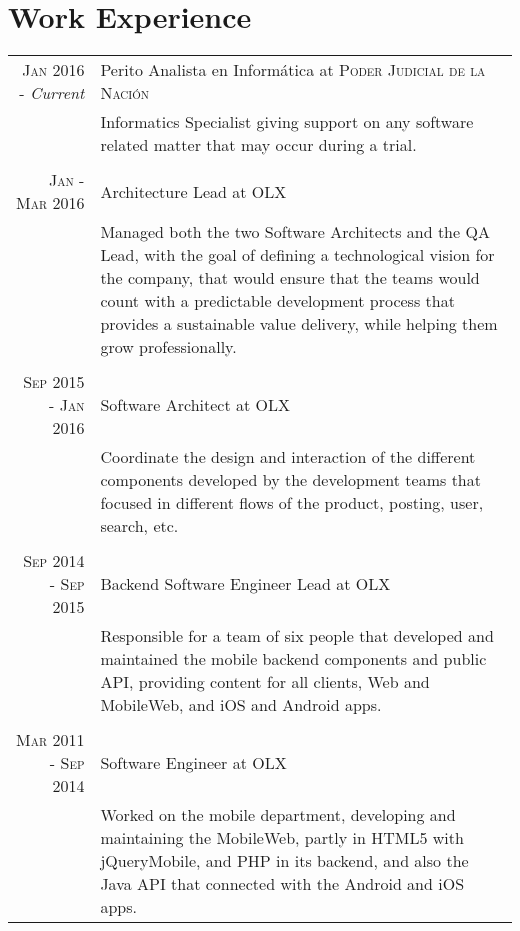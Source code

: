 \documentclass[a4paper,10pt]{article}
\begin{document}
\section{Work Experience}
\begin{tabular}{r|p{11cm}}

 \textsc{Jan 2016 - }\emph{Current} & Perito Analista en Informática at \textsc{Poder Judicial de la Nación} \\
 &\footnotesize{Informatics Specialist giving support on any software related matter that may occur during a trial.}\\
 
 \multicolumn{2}{c}{} \\
 
 \textsc{Jan - Mar 2016} & Architecture Lead at \textsc{OLX} \\
 &\footnotesize{Managed both the two Software Architects and the QA Lead, with the goal of defining a technological vision for the company, that would ensure that the teams would count with a predictable development process that provides a sustainable value delivery, while helping them grow professionally.}\\

\multicolumn{2}{c}{} \\

\textsc{Sep 2015 - Jan 2016} & Software Architect at \textsc{OLX} \\
 &\footnotesize{Coordinate the design and interaction of the different components developed by the development teams that focused in different flows of the product, posting, user, search, etc.}\\

\multicolumn{2}{c}{} \\

\textsc{Sep 2014 - Sep 2015} & Backend Software Engineer Lead at \textsc{OLX} \\
 &\footnotesize{Responsible for a team of six people that developed and maintained the mobile backend components and public API, providing content for all clients, Web and MobileWeb, and iOS and Android apps.}\\

\multicolumn{2}{c}{} \\

\textsc{Mar 2011 - Sep 2014} & Software Engineer at \textsc{OLX} \\
 &\footnotesize{Worked on the mobile department, developing and maintaining the MobileWeb, partly in HTML5 with jQueryMobile, and PHP in its backend, and also the Java API that connected with the Android and iOS apps. 
 
}
\end{tabular}
\end{document}
